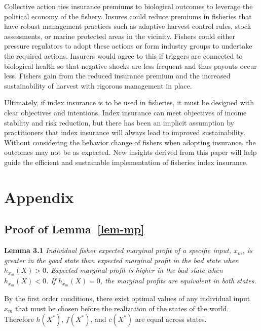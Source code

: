 \documentclass[
  letterpaper,
  DIV=11,
  numbers=noendperiod]{scrartcl}
\theoremstyle{plain}
\theoremstyle{plain}
\theoremstyle{remark}
\begin{document}
Collective action ties insurance premiums to biological outcomes to
leverage the political economy of the fishery. Insures could reduce
premiums in fisheries that have robust management practices such as
adaptive harvest control rules, stock assessments, or marine protected
areas in the vicinity. Fishers could either pressure regulators to adopt
these actions or form industry groups to undertake the required actions.
Insurers would agree to this if triggers are connected to biological
health so that negative shocks are less frequent and thus payouts occur
less. Fishers gain from the reduced insurance premium and the increased
sustainability of harvest with rigorous management in place.

Ultimately, if index insurance is to be used in fisheries, it must be
designed with clear objectives and intentions. Index insurance can meet
objectives of income stability and risk reduction, but there has been an
implicit assumption by practitioners that index insurance will always
lead to improved sustainability. Without considering the behavior change
of fishers when adopting insurance, the outcomes may not be as expected.
New insights derived from this paper will help guide the efficient and
sustainable implementation of fisheries index insurance.

\newpage
\appendix
\renewcommand{\thefigure}{A\arabic{figure}}
\renewcommand{\thetable}{A\arabic{table}}
\setcounter{figure}{0}
\setcounter{table}{0}

\hypertarget{appendix}{%
\section{Appendix}\label{appendix}}

\hypertarget{proof-of-lem-mp}{%
\subsection{\texorpdfstring{Proof of
Lemma~\ref{lem-mp}}{Proof of Lemma~}}\label{proof-of-lem-mp}}

\textbf{Lemma 3.1} \emph{Individual fisher expected marginal profit of a
specific input, \(x_m\), is greater in the good state than expected
marginal profit in the bad state when \(h_{x_m}(X)>0\). Expected
marginal profit is higher in the bad state when \(h_{x_m}(X)<0\). If
\(h_{x_m}(X)=0\), the marginal profits are equivalent in both states.}

By the first order conditions, there exist optimal values of any
individual input \(x_m\) that must be chosen before the realization of
the states of the world. Therefore \(h(X^*)\), \(f(X^*)\), and
\(c(X^*)\) are equal across states.
\end{document}
